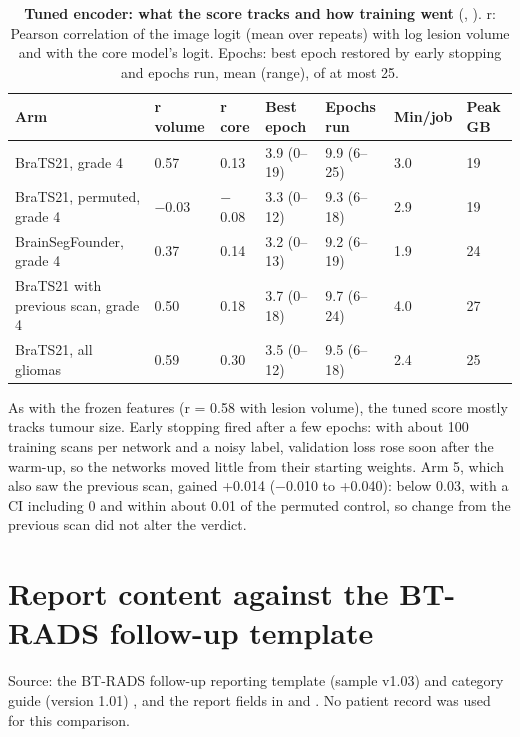 \documentclass[11pt,a4paper]{article}
\begin{document}
\begin{table}[H]
\centering
\small
\renewcommand{\thetable}{S5}\renewcommand{\theHtable}{S5}
\caption{\textbf{Tuned encoder: what the score tracks and how training went} (,
). r: Pearson correlation of the image logit (mean over repeats) with log lesion volume and with the
core model's logit. Epochs: best epoch restored by early stopping and epochs run, mean (range), of at most 25.}
\label{tab:S43}
\begin{tabularx}{\linewidth}{@{}L R{1.4cm} R{1.4cm} R{1.9cm} R{1.9cm} R{1.2cm} R{1.1cm}@{}}
\toprule
Arm & r volume & r core & Best epoch & Epochs run & Min/job & Peak GB \\
\midrule
BraTS21, grade 4 & 0.57 & 0.13 & 3.9 (0--19) & 9.9 (6--25) & 3.0 & 19 \\
BraTS21, permuted, grade 4 & $-$0.03 & $-$0.08 & 3.3 (0--12) & 9.3 (6--18) & 2.9 & 19 \\
BrainSegFounder, grade 4 & 0.37 & 0.14 & 3.2 (0--13) & 9.2 (6--19) & 1.9 & 24 \\
BraTS21 with previous scan, grade 4 & 0.50 & 0.18 & 3.7 (0--18) & 9.7 (6--24) & 4.0 & 27 \\
BraTS21, all gliomas & 0.59 & 0.30 & 3.5 (0--12) & 9.5 (6--18) & 2.4 & 25 \\
\bottomrule
\end{tabularx}
\end{table}

As with the frozen features (r = 0.58 with lesion volume), the tuned score mostly tracks tumour size. Early
stopping fired after a few epochs: with about 100 training scans per network and a noisy label, validation loss
rose soon after the warm-up, so the networks moved little from their starting weights. Arm 5, which also saw the previous scan, gained +0.014
($-$0.010 to +0.040): below 0.03, with a CI including 0 and within about 0.01 of the permuted control, so change
from the previous scan did not alter the verdict.

\FloatBarrier
\section{Report content against the BT-RADS follow-up template}\label{sec:S24}

Source: the BT-RADS follow-up reporting template (sample v1.03) and category guide (version 1.01)
\citep{btradsweb,weinberg2018}, and the report fields in  and .
No patient record was used for this comparison.
\end{document}
